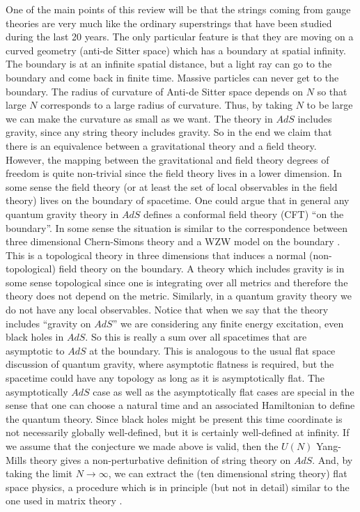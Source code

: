 One of the main points of this review 
will be that the strings coming from gauge theories
are very much like the ordinary superstrings that have been 
studied during the last 20 years. The only particular feature is that
they are moving on a curved geometry 
(anti-de Sitter space) which has a boundary at spatial infinity. 
The boundary is at an infinite spatial distance, but a light ray 
can go to the boundary and come back in finite time. Massive particles
can never get to the boundary. The radius of curvature of 
Anti-de Sitter space 
 depends on $N$  so  that large $N$ corresponds to a large radius
of curvature. Thus, by taking $N$ to be large 
we can make the curvature as small as we want. 
The theory in $AdS$ includes gravity, since any string theory 
includes gravity. So in the end we claim that there is an equivalence
between a gravitational 
theory and a field theory. However, the mapping between the gravitational
and field theory degrees of freedom is quite non-trivial since
the field theory lives in a lower dimension. In some sense the 
field theory (or at least the set of 
local observables in the field theory)
lives on the boundary of spacetime. 
One could argue that in general any quantum gravity theory in $AdS$
defines a conformal field theory (CFT) ``on the boundary''. 
In some sense the situation is similar to the correspondence
between three dimensional Chern-Simons theory and a WZW model on
the boundary \cite{Witten:1989hf}. This is a topological theory in three 
dimensions that induces a normal (non-topological) 
 field theory on the boundary.
A theory which includes gravity
is in some sense topological since one is integrating
over all metrics and therefore the theory does not depend on the
metric. Similarly, in a quantum gravity theory we do not
have any local observables. 
Notice that when we say that the theory includes
``gravity on $AdS$'' we are considering
any finite energy excitation, even black holes in $AdS$. 
So this is really a sum over all spacetimes that are asymptotic to 
$AdS$ at the boundary. This is analogous to the usual 
flat space discussion of quantum gravity,
where asymptotic flatness is required, but
the spacetime could have any topology as long as it is asymptotically 
flat. The asymptotically $AdS$ case as well as the asymptotically 
flat cases are special in the sense that one can choose a natural
time and an associated Hamiltonian to define the quantum theory. 
Since black holes might be present this time coordinate is not 
necessarily
globally well-defined, but it is certainly well-defined at infinity. 
If we assume that the conjecture we made above is valid, then the $U(N)$ 
Yang-Mills theory 
gives a non-perturbative definition of string theory on $AdS$.
And, by taking the limit $N\to \infty$, we can extract the (ten
dimensional string theory) flat space
physics, a procedure  which is in principle (but not in detail) 
similar to the one used in matrix theory \cite{Banks:1997vh}. 

